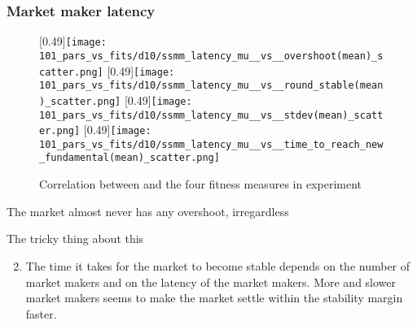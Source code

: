 \subsubsection*{Market maker latency}
\begin{figure}
	\centering
	[0.49\linewidth]{\texttt{[image: 101\_pars\_vs\_fits/d10/ssmm\_latency\_mu\_\_vs\_\_overshoot(mean)\_scatter.png]}}
	[0.49\linewidth]{\texttt{[image: 101\_pars\_vs\_fits/d10/ssmm\_latency\_mu\_\_vs\_\_round\_stable(mean)\_scatter.png]}}
	[0.49\linewidth]{\texttt{[image: 101\_pars\_vs\_fits/d10/ssmm\_latency\_mu\_\_vs\_\_stdev(mean)\_scatter.png]}}
	[0.49\linewidth]{\texttt{[image: 101\_pars\_vs\_fits/d10/ssmm\_latency\_mu\_\_vs\_\_time\_to\_reach\_new\_fundamental(mean)\_scatter.png]}}
	\caption{Correlation between \sclatencymu and the four fitness measures in experiment \dten}
	\label{fig:d10_parvfit_ssmmlatencymu}
\end{figure}

The market almost never has any overshoot, irregardless 

The tricky thing about this


\begin{enumerate}
\setcounter{enumi}{1}
\item The time it takes for the market to become stable depends on the number of market makers and on the latency of the market makers. More and slower market makers seems to make the market settle within the stability margin faster.
\end{enumerate}



